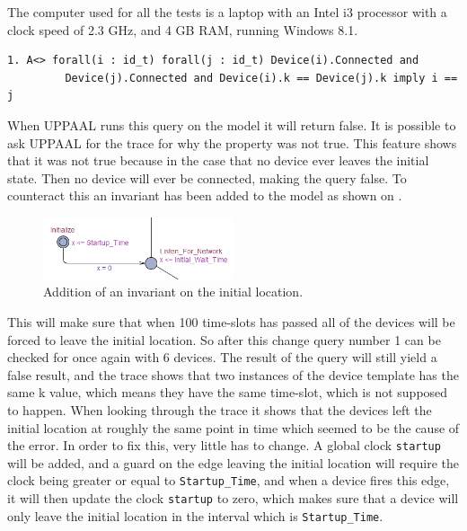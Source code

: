 The computer used for all the tests is a laptop with an Intel i3 processor with a clock speed of 2.3 GHz, and 4 GB RAM, running Windows 8.1.

\noindent\begin{minipage}{\textwidth}
\begin{lstlisting}[style=UPPAAL, title={This query requires that eventually if all devices are connected, then no pair of devices have the same \texttt{k}, unless the pair consists of the same two devices.}]
1. A<> forall(i : id_t) forall(j : id_t) Device(i).Connected and
         Device(j).Connected and Device(i).k == Device(j).k imply i == j
\end{lstlisting}
\end{minipage}

\noindent
When UPPAAL runs this query on the model it will return false.
It is possible to ask UPPAAL for the trace for why the property was not true.
This feature shows that it was not true because in the case that no device ever leaves the initial state. 
Then no device will ever be connected, making the query false.
To counteract this an invariant has been added to the model as shown on .

\begin{figure}
  \includegraphics[width=0.5\textwidth]{Figures/Model/InvariantOnStartup.PNG} 
\caption{Addition of an invariant on the initial location.}
\label{UPPAALInvariant}
\end{figure}

This will make sure that when 100 time-slots has passed all of the devices will be forced to leave the initial location.
So after this change query number 1 can be checked for once again with 6 devices.
The result of the query will still yield a false result, and the trace shows that two instances of the device template has the same k value, which means they have the same time-slot, which is not supposed to happen.
When looking through the trace it shows that the devices left the initial location at roughly the same point in time which seemed to be the cause of the error.
In order to fix this, very little has to change.
A global clock \texttt{startup} will be added, and a guard on the edge leaving the initial location will require the clock being greater or equal to \texttt{Startup\_Time}, and when a device fires this edge, it will then update the clock \texttt{startup} to zero, which makes sure that a device will only leave the initial location in the interval which is \texttt{Startup\_Time}.

